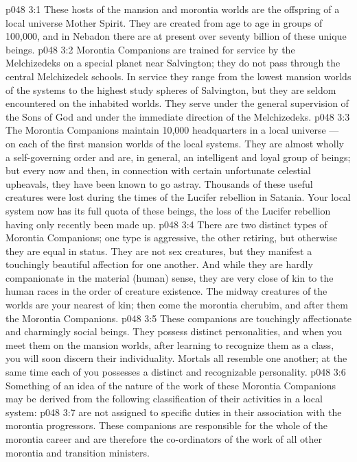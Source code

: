 \vs p048 3:1 These hosts of the mansion and morontia worlds are the offspring of a local universe Mother Spirit. They are created from age to age in groups of 100,000, and in Nebadon there are at present over seventy billion of these unique beings.
\vs p048 3:2 Morontia Companions are trained for service by the Melchizedeks on a special planet near Salvington; they do not pass through the central Melchizedek schools. In service they range from the lowest mansion worlds of the systems to the highest study spheres of Salvington, but they are seldom encountered on the inhabited worlds. They serve under the general supervision of the Sons of God and under the immediate direction of the Melchizedeks.
\vs p048 3:3 The Morontia Companions maintain 10,000 headquarters in a local universe --- on each of the first mansion worlds of the local systems. They are almost wholly a self\hyp{}governing order and are, in general, an intelligent and loyal group of beings; but every now and then, in connection with certain unfortunate celestial upheavals, they have been known to go astray. Thousands of these useful creatures were lost during the times of the Lucifer rebellion in Satania. Your local system now has its full quota of these beings, the loss of the Lucifer rebellion having only recently been made up.
\vs p048 3:4 \pc There are two distinct types of Morontia Companions; one type is aggressive, the other retiring, but otherwise they are equal in status. They are not sex creatures, but they manifest a touchingly beautiful affection for one another. And while they are hardly companionate in the material (human) sense, they are very close of kin to the human races in the order of creature existence. The midway creatures of the worlds are your nearest of kin; then come the morontia cherubim, and after them the Morontia Companions.
\vs p048 3:5 These companions are touchingly affectionate and charmingly social beings. They possess distinct personalities, and when you meet them on the mansion worlds, after learning to recognize them as a class, you will soon discern their individuality. Mortals all resemble one another; at the same time each of you possesses a distinct and recognizable personality.
\vs p048 3:6 \pc Something of an idea of the nature of the work of these Morontia Companions may be derived from the following classification of their activities in a local system:
\vs p048 3:7 \bibnobreakspace {} are not assigned to specific duties in their association with the morontia progressors. These companions are responsible for the whole of the morontia career and are therefore the co\hyp{}ordinators of the work of all other morontia and transition ministers.
